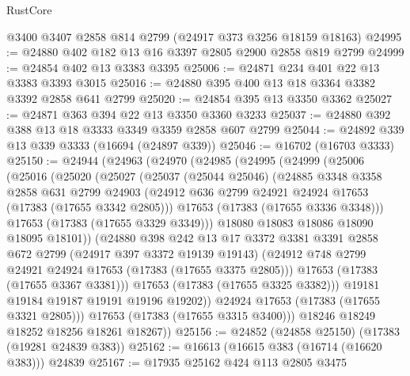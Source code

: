 \begin{lexlean}{RustCore}
\begin{coremodule}
    @3400
    @3407
    @2858
    @814
    @2799
    (@24917 @373 @3256 @18159 @18163)
@24995 := @24880 @402 @182 @13 @16 @3397 @2805 @2900 @2858 @819 @2799
@24999 := @24854 @402 @13 @3383 @3395
@25006 := @24871 @234 @401 @22 @13 @3383 @3393 @3015
@25016 := @24880 @395 @400 @13 @18 @3364 @3382 @3392 @2858 @641 @2799
@25020 := @24854 @395 @13 @3350 @3362
@25027 := @24871 @363 @394 @22 @13 @3350 @3360 @3233
@25037 := @24880 @392 @388 @13 @18 @3333 @3349 @3359 @2858 @607 @2799
@25044 := @24892 @339 @13 @339 @3333 (@16694 (@24897 @339))
@25046 := @16702 (@16703 @3333)
@25150 := @24944
    (@24963
      (@24970
        (@24985
          (@24995
            (@24999
              (@25006
                (@25016
                  (@25020
                    (@25027
                      (@25037
                        (@25044 @25046)
                        (@24885
                          @3348
                          @3358
                          @2858
                          @631
                          @2799
                          @24903
                          (@24912 @636 @2799 @24921 @24924 @17653 (@17383 (@17655 @3342 @2805)))
                          @17653
                          (@17383 (@17655 @3336 @3348)))
                        @17653
                        (@17383 (@17655 @3329 @3349)))
                      @18080
                      @18083
                      @18086
                      @18090
                      @18095
                      @18101))
                  (@24880
                    @398
                    @242
                    @13
                    @17
                    @3372
                    @3381
                    @3391
                    @2858
                    @672
                    @2799
                    (@24917 @397 @3372 @19139 @19143)
                    (@24912 @748 @2799 @24921 @24924 @17653 (@17383 (@17655 @3375 @2805)))
                    @17653
                    (@17383 (@17655 @3367 @3381)))
                  @17653
                  (@17383 (@17655 @3325 @3382)))
                @19181
                @19184
                @19187
                @19191
                @19196
                @19202))
            @24924
            @17653
            (@17383 (@17655 @3321 @2805)))
          @17653
          (@17383 (@17655 @3315 @3400)))
        @18246
        @18249
        @18252
        @18256
        @18261
        @18267))
@25156 := @24852 (@24858 @25150) (@17383 (@19281 @24839 @383))
@25162 := @16613 (@16615 @383 (@16714 (@16620 @383))) @24839
@25167 := @17935 @25162 @424 @113 @2805 @3475

\end{coremodule}
\end{lexlean}
